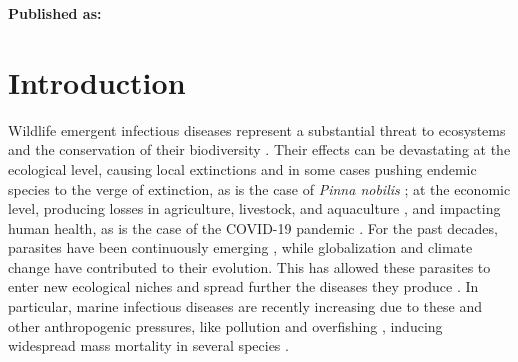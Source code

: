 \vspace{3cm}






\textbf{Published as:}

\vspace{0.5cm}


\newpage
\section{Introduction}

Wildlife emergent infectious diseases represent a substantial threat to
ecosystems and the conservation of their biodiversity \cite{Daszak2000}. Their
effects can be devastating at the ecological level, causing local extinctions
\cite{Daszak2000} and in some cases pushing endemic species to the verge of
extinction, as is the case of \textit{Pinna nobilis} \cite{Cabanellas2019}; at
the economic level, producing losses in agriculture, livestock, and aquaculture
\cite{Vurro2010, Tomley2009, Pernet2016}, and impacting human health, as is the
case of the COVID-19 pandemic \cite{Salata2020}. For the past decades,
parasites have been continuously emerging \cite{Morens2004, Daszak2017}, while
globalization and climate change have contributed to their evolution. This has
allowed these parasites to enter new ecological niches and spread further the
diseases they produce \cite{Aguirre2008}. In particular, marine infectious
diseases are recently increasing due to these and other anthropogenic
pressures, like pollution and overfishing \cite{Lafferty2004}, inducing
widespread mass mortality in several species \cite{Eisenlord2016, JONES201648,
    VAZQUEZ2017}.

